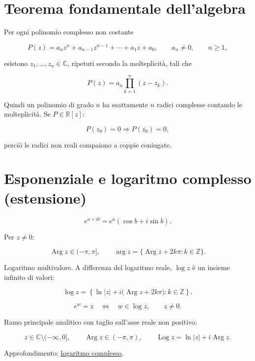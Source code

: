 \section{Teorema fondamentale dell'algebra}\label{teorema-fondamentale-dellalgebra}

Per ogni polinomio complesso non costante

\[
P(z)=a_nz^n+a_{n-1}z^{n-1}+\cdots+a_1z+a_0,
\qquad a_n\ne0,
\qquad n\ge1,
\]

esistono \(z_1,\ldots,z_n\in\mathbb C\), ripetuti secondo la molteplicità, tali che

\[
P(z)=a_n\prod_{k=1}^{n}(z-z_k).
\]

Quindi un polinomio di grado \(n\) ha esattamente \(n\) radici complesse contando le molteplicità. Se \(P\in\mathbb R[z]\):

\[
P(z_0)=0
\Longrightarrow
P(\overline{z_0})=0,
\]

perciò le radici non reali compaiono a coppie coniugate.

\section{Esponenziale e logaritmo complesso (estensione)}\label{esponenziale-e-logaritmo-complesso-estensione}

\[
\displaystyle
e^{a+ib}=e^a(\cos b+i\sin b).
\]

Per \(z\ne0\):

\[
\displaystyle
\operatorname{Arg}z\in(-\pi,\pi],
\qquad
\arg z
=
\{\operatorname{Arg}z+2k\pi:k\in\mathbb Z\}.
\]

Logaritmo multivalore. A differenza del logaritmo reale, \(\log z\) è un insieme infinito di valori:

\[
\displaystyle
\log z
=
\left\{
\ln|z|+i\bigl(\operatorname{Arg}z+2k\pi\bigr):
k\in\mathbb Z
\right\}.
\]

\[
\displaystyle
e^w=z
\quad\Longleftrightarrow\quad
w\in\log z,
\qquad z\ne0.
\]

Ramo principale analitico con taglio sull'asse reale non positivo:

\[
\displaystyle
z\in\mathbb C\setminus(-\infty,0],
\qquad
\operatorname{Arg}z\in(-\pi,\pi),
\qquad
\operatorname{Log}z
=
\ln|z|+i\operatorname{Arg}z.
\]

Approfondimento: \href{https://ingegnerismo.it/matematica/logaritmo-complesso/}{logaritmo complesso}.
